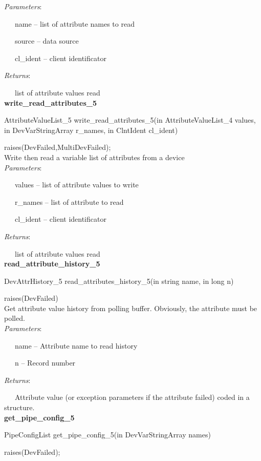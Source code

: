 \emph{Parameters}:

~~~name – list of attribute names to read

~~~source – data source

~~~cl\_ident – client identificator

\emph{Returns}:

~~~list of attribute values read\\

\textbf{write\_read\_attributes\_5}

AttributeValueList\_5 write\_read\_attributes\_5(in AttributeValueList\_4
values, in DevVarStringArray r\_names, in ClntIdent cl\_ident)

raises(DevFailed,MultiDevFailed);\\

Write then read a variable list of attributes from a device\\

\emph{Parameters}:

~~~values – list of attribute values to write

~~~r\_names – list of attribute to read

~~~cl\_ident – client identificator

\emph{Returns}:

~~~list of attribute values read\textbf{}\\

\textbf{read\_attribute\_history\_5}

DevAttrHistory\_5 read\_attributes\_history\_5(in string name, in
long n)

raises(DevFailed)\\

Get attribute value history from polling buffer. Obviously, the attribute
must be polled.\\

\emph{Parameters}:

~~~name – Attribute name to read history

~~~n – Record number

\emph{Returns}:

~~~Attribute value (or exception parameters if the attribute failed)
coded in a structure.\\

\textbf{get\_pipe\_config\_5}

PipeConfigList get\_pipe\_config\_5(in DevVarStringArray names)

raises(DevFailed);\\


